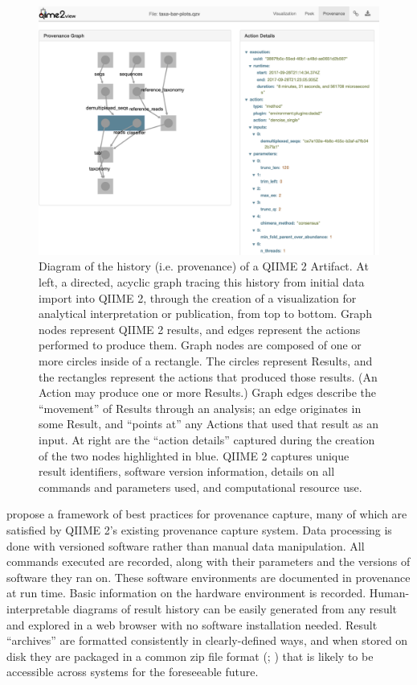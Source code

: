 \begin{figure}[htp]
\centering
\includegraphics[width=\textwidth]{figures/provenance_graph.png}
\caption[Diagram of the history (provenance) of a QIIME 2 Artifact]%
{Diagram of the history (i.e. provenance) of a QIIME 2 Artifact. At left, a
directed, acyclic graph tracing this history from initial data import into QIIME
2, through the creation of a visualization for analytical interpretation or
publication, from top to bottom. Graph nodes represent QIIME 2 results, and
edges represent the actions performed to produce them. Graph nodes are composed
of one or more circles inside of a rectangle. The circles represent Results, and
the rectangles represent the actions that produced those results. (An Action may
produce one or more Results.) Graph edges describe the “movement” of Results
through an analysis; an edge originates in some Result, and “points at” any
Actions that used that result as an input. At right are the “action details”
captured during the creation of the two nodes highlighted in blue. QIIME 2
captures unique result identifiers, software version information, details on all
commands and parameters used, and computational resource use.}
\label{fig:provenance_graph}
\end{figure}

\textcite{khan_sharing_2019} propose a framework of best practices for provenance capture,
many of which are satisfied by QIIME 2’s existing provenance capture system.
Data processing is done with versioned software rather than manual data
manipulation. All commands executed are recorded, along with their parameters
and the versions of software they ran on. These software environments are
documented in provenance at run time. Basic information
on the hardware environment is recorded. Human-interpretable diagrams of result
history can be easily generated from any result and explored in a web browser
with no software installation needed. Result “archives” are formatted
consistently in clearly-defined ways, and when stored on disk they are packaged
in a common zip file format (\cite{noauthor_appnote_2020}; \cite{iso_isoiec_2015})
that is likely to be accessible across systems for the foreseeable future.

